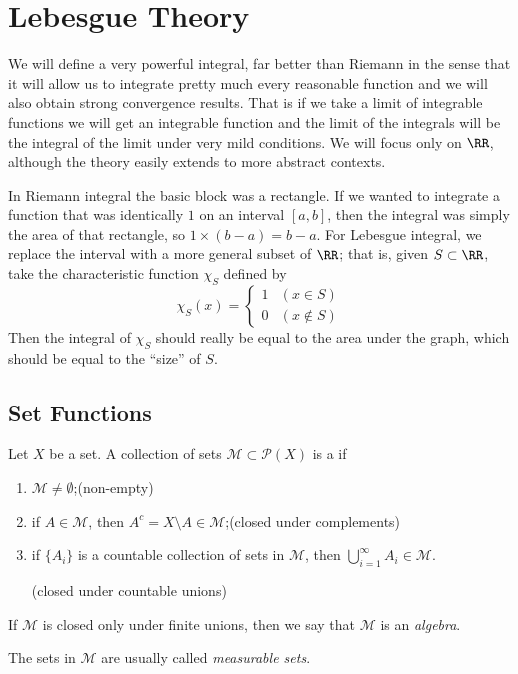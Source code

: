 \chapter{Lebesgue Theory}
We will define a very powerful integral, far better than Riemann in the sense that it will allow us to integrate pretty much every reasonable function and we will also obtain strong convergence results. That is if we take a limit of integrable functions we will get an integrable function and the limit of the integrals will be the integral of the limit under very mild conditions. We will focus only on $\RR$, although the theory easily extends to more abstract contexts.

In Riemann integral the basic block was a rectangle. If we wanted to integrate a function that was identically $1$ on an interval $[a,b]$, then the integral was simply the area of that rectangle, so $1\times(b-a)=b-a$. For Lebesgue integral, we replace the interval with a more general subset of $\RR$; that is, given $S\subset\RR$, take the characteristic function $\chi_S$ defined by
\[\chi_S(x)=\begin{cases}
1&(x\in S)\\
0&(x\notin S)
\end{cases}\]
Then the integral of $\chi_S$ should really be equal to the area under the graph, which should be equal to the ``size'' of $S$.

\section{Set Functions}
\begin{definition}
Let $X$ be a set. A collection of sets $\mathcal{M}\subset\mathcal{P}(X)$ is a  if
\begin{enumerate}[label=(\roman*)]
\item $\mathcal{M}\neq\emptyset$;\hfill(non-empty)
\item if $A\in\mathcal{M}$, then $A^c=X\setminus A\in\mathcal{M}$;\hfill(closed under complements)
\item if $\{A_i\}$ is a countable collection of sets in $\mathcal{M}$, then $\bigcup_{i=1}^{\infty}A_i\in\mathcal{M}$.

\hfill(closed under countable unions)
\end{enumerate}
If $\mathcal{M}$ is closed only under finite unions, then we say that $\mathcal{M}$ is an \emph{algebra}.

The sets in $\mathcal{M}$ are usually called \emph{measurable sets}.
\end{definition}

